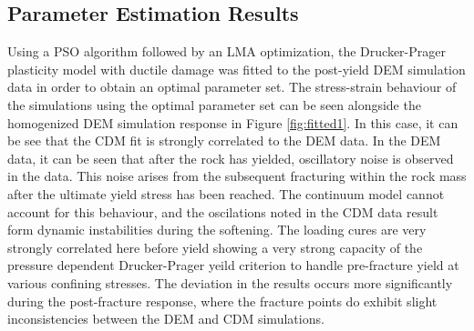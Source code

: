 \subsection{Parameter Estimation Results}

Using a PSO algorithm followed by an LMA optimization, the Drucker-Prager plasticity model with ductile damage was fitted to the post-yield DEM simulation data in order to obtain an optimal parameter set. The stress-strain behaviour of the simulations using the optimal parameter set can be seen alongside the homogenized DEM simulation response in Figure \ref{fig:fitted1}. In this case, it can be see that the CDM fit is strongly correlated to the DEM data. In the DEM data, it can be seen that after the rock has yielded, oscillatory noise is observed in the data. This noise arises from the subsequent fracturing within the rock mass after the ultimate yield stress has been reached. The continuum model cannot account for this behaviour, and the oscilations noted in the CDM data result form dynamic instabilities during the softening. The loading cures are very strongly correlated here before yield showing a very strong capacity of the pressure dependent Drucker-Prager yeild criterion to handle pre-fracture yield at various confining stresses. The deviation in the results occurs more significantly during the post-fracture response, where the fracture points do exhibit slight inconsistencies between the DEM and CDM simulations. 